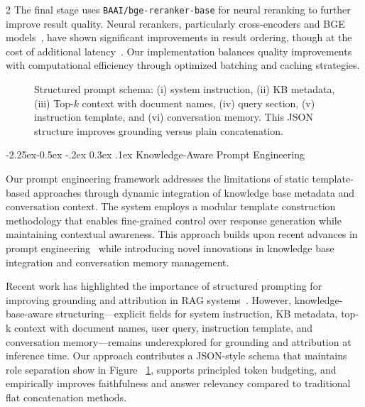 \documentclass[10pt,letterpaper]{article}
\makeatletter
\let\cite\citep
\renewcommand{\subsection}{\@startsection{subsection}{2}{\z@}%
                                     {-2.25ex\@plus -0.5ex \@minus -.2ex}%
                                     {0.3ex \@plus .1ex}%
                                     {\normalfont\normalsize\itshape\bfseries}}
\renewcommand{\subsubsection}{\@startsection{subsubsection}{3}{\z@}%
                                     {-2.25ex\@plus -0.5ex \@minus -.2ex}%
                                     {0.3ex \@plus .1ex}%
                                     {\normalfont\normalsize\itshape}}
\makeatother
\begin{document}
\begin{multicols}{2}
The final stage uses \texttt{BAAI/bge-reranker-base} for neural reranking to further improve result quality. Neural rerankers, particularly cross-encoders and BGE models~\cite{nogueira2019rerankbert,xu2023bge}, have shown significant improvements in result ordering, though at the cost of additional latency~\cite{mao2023neural}. Our implementation balances quality improvements with computational efficiency through optimized batching and caching strategies.

\begin{figure}[H]
    \centering
    
    \caption{Structured prompt schema: (i) system instruction, (ii) KB metadata, (iii) Top-$k$ context with document names, (iv) query section, (v) instruction template, and (vi) conversation memory. This JSON structure improves grounding versus plain concatenation.}
    \label{fig:system_prompt}
\end{figure}

\subsection{Knowledge-Aware Prompt Engineering}

Our prompt engineering framework addresses the limitations of static template-based approaches through dynamic integration of knowledge base metadata and conversation context. The system employs a modular template construction methodology that enables fine-grained control over response generation while maintaining contextual awareness. This approach builds upon recent advances in prompt engineering~\cite{wei2022chain,liu2023chained} while introducing novel innovations in knowledge base integration and conversation memory management.

Recent work has highlighted the importance of structured prompting for improving grounding and attribution in RAG systems~\cite{gupta2024comprehensive}. However, knowledge-base-aware structuring—explicit fields for system instruction, KB metadata, top-k context with document names, user query, instruction template, and conversation memory—remains underexplored for grounding and attribution at inference time. Our approach contributes a JSON-style schema that maintains role separation show in Figure ~\ref{fig:system_prompt}, supports principled token budgeting, and empirically improves faithfulness and answer relevancy compared to traditional flat concatenation methods.



\end{multicols}
\end{document}
